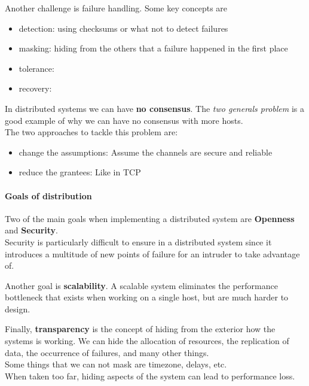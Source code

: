 \documentclass{article}
\begin{document}
Another challenge is failure handling. Some key concepts are
\begin{itemize}
    \item detection: using checksums or what not to detect failures
    \item masking: hiding from the others that a failure happened in the first place
    \item tolerance:
    \item recovery: 
\end{itemize}

In distributed systems we can have \textbf{no consensus}. The \textit{two generals problem} is a good example of why we can have no consensus with more hosts.\\
The two approaches to tackle this problem are:
\begin{itemize}
    \item change the assumptions: Assume the channels are secure and reliable
    \item reduce the grantees: Like in TCP
\end{itemize}

\paragraph{Goals of distribution}
Two of the main goals when implementing a distributed system are \textbf{Openness} and \textbf{Security}.\\
Security is particularly difficult to ensure in a distributed system since it introduces a multitude of new points of failure for an intruder to take advantage of.

Another goal is \textbf{scalability}. A scalable system eliminates the performance bottleneck that exists when working on a single host, but are much harder to design.

Finally, \textbf{transparency} is the concept of hiding from the exterior how the systems is working. We can hide the allocation of resources, the replication of data, the occurrence of failures, and many other things.\\
Some things that we can not mask are timezone, delays, etc.\\
When taken too far, hiding aspects of the system can lead to performance loss.
\end{document}
